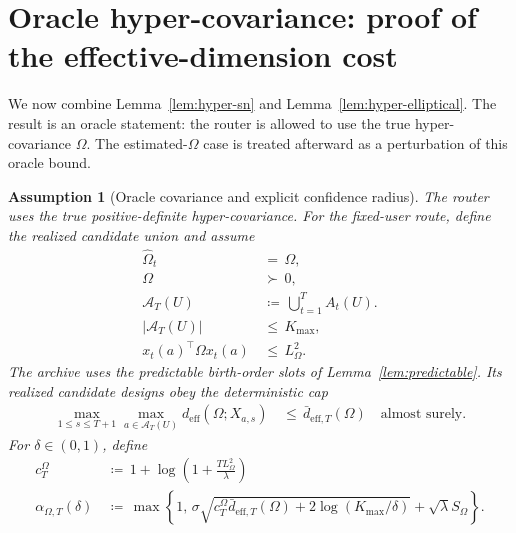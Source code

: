 \documentclass{article} %
\newtheorem{assumption}{Assumption}
\begin{document}
\section{Oracle hyper-covariance: proof of the effective-dimension cost}
\label{sec:theory-oracle-hyper}

We now combine Lemma~\ref{lem:hyper-sn} and Lemma~\ref{lem:hyper-elliptical}.  The result is an oracle statement: the router is allowed to use the true hyper-covariance \(\Omega\).  The estimated-\(\Omega\) case is treated afterward as a perturbation of this oracle bound.

\begin{assumption}[Oracle covariance and explicit confidence radius]
\label{ass:hyper-oracle-calibrated}
The router uses the true positive-definite hyper-covariance. For the fixed-user
route, define the realized candidate union and assume
\begin{align}
\widehat{\Omega}_t
&\,=\,
\Omega,
\label{eq:hyper-oracle-omega-known}
\\
\Omega
&\,\succ\,
0,
\label{eq:hyper-oracle-omega-pd}
\\
\mathcal A_T(U)
&\,\coloneqq\,
\bigcup_{t=1}^{T}A_t(U).
\label{eq:hyper-oracle-union}
\\
|\mathcal A_T(U)|
&\,\leq\,
K_{\max},
\label{eq:hyper-oracle-kmax}
\\
x_t(a)^\top\Omega x_t(a)
&\,\leq\,
L_{\Omega}^{2}.
\label{eq:hyper-oracle-feature-bound}
\end{align}
The archive uses the predictable birth-order slots of
Lemma~\ref{lem:predictable}. Its realized candidate designs obey the
deterministic cap
\begin{equation}
\label{eq:hyper-oracle-deff-cap}
\begin{aligned}
\max_{1\le s\le T+1}\max_{a\in\mathcal A_T(U)}
d_{\mathrm{eff}}(\Omega;X_{a,s})
&\,\leq\,
\bar d_{\mathrm{eff},T}(\Omega)
\quad\text{almost surely}.
\end{aligned}
\end{equation}
For \(\delta\in(0,1)\), define
\begin{align}
c_T^\Omega
&\,\coloneqq\,
1+\log\!\left(1+\frac{TL_\Omega^2}{\lambda}\right)
\label{eq:hyper-oracle-cT}
\\
\alpha_{\Omega,T}(\delta)
&\,\coloneqq\,
\max\!\left\{
1,\,
\sigma\sqrt{
c_T^\Omega\bar d_{\mathrm{eff},T}(\Omega)
+2\log(K_{\max}/\delta)}
+\sqrt{\lambda}S_\Omega
\right\}.
\label{eq:hyper-oracle-alpha}
\end{align}
\end{assumption}
\end{document}
